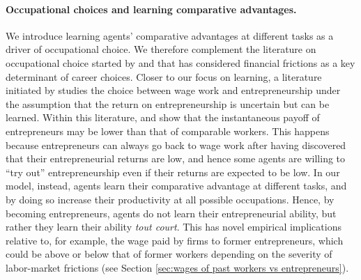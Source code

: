 \documentclass[12pt,american]{paper}
\theoremstyle{remark}
\begin{document}
\paragraph{Occupational choices and learning comparative advantages.} 
We introduce learning agents' comparative advantages at different tasks as a driver of occupational choice. We therefore complement the literature on occupational choice started by \cite{Banerjee1993} and \cite{Galor1993} that has considered financial frictions as a key determinant of career choices. Closer to our focus on learning, a literature initiated by \cite{vereshchagina2009risk}  studies the choice between wage work and entrepreneurship under the assumption that the return on entrepreneurship is uncertain but can be learned.  Within this literature, \cite{manso2016experimentation} and \cite{NBERw23168} show that the instantaneous payoff of entrepreneurs may be lower than that of comparable workers. This happens because entrepreneurs can always go back to wage work after having discovered that their entrepreneurial returns are low, and hence some agents are willing to ``try out'' entrepreneurship even if their returns are expected to be low. In our model, instead, agents learn their comparative advantage at different tasks, and by doing so increase their productivity at all possible occupations. Hence, by becoming entrepreneurs, agents do not learn their entrepreneurial ability, but rather they learn their ability \emph{tout court}. This has novel empirical implications relative to, for example,  the wage paid by firms to former entrepreneurs, which could be above or below that of  former workers depending on the severity of labor-market frictions (see Section \ref{sec:wages of past workers vs entrepreneurs}). %
\end{document}
